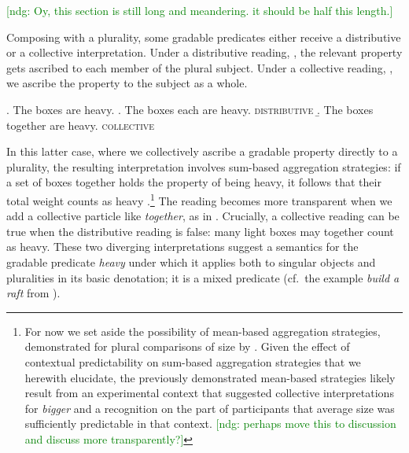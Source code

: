 \documentclass[linguex]{sp}
\newcommand{\ndg}[1]{\textcolor{Green}{[ndg: #1]}}
\begin{document}
%

\ndg{Oy, this section is still long and meandering. it should be half this length.}

Composing with a plurality, some gradable predicates either receive a {distributive} or a {collective} interpretation. Under a distributive reading, \Next[a], the relevant property gets ascribed to each member of the plural subject. Under a collective reading, \Next[b], we ascribe the property to the subject as a whole.

\ex. The boxes are heavy.
\a. The boxes each are heavy. \hfill \textsc{distributive}
\b. The boxes together are heavy. \hfill \textsc{collective}

In this latter case, where we collectively ascribe a gradable property directly to a plurality, the resulting interpretation involves sum-based aggregation strategies: if a set of boxes together holds the property of being heavy, it follows that their total weight counts as heavy \citep{scha1984}.\footnote{For now we set aside the possibility of mean-based aggregation strategies, demonstrated for plural comparisons of size by \cite{scontrasetal2012}. Given the effect of contextual predictability on sum-based aggregation strategies that we herewith elucidate, the previously demonstrated mean-based strategies likely result from an experimental context that suggested collective interpretations for \emph{bigger} and a recognition on the part of participants that average size was sufficiently predictable in that context. \ndg{perhaps move this to discussion and discuss more transparently?}} The reading becomes more transparent when we add a collective particle like \emph{together}, as in \Last[b]. Crucially, a collective reading can be true when the distributive reading is false: many light boxes may together count as heavy. These two diverging interpretations suggest a semantics for the gradable predicate \emph{heavy} under which it applies both to singular objects and pluralities in its basic denotation; it is a mixed predicate (cf.~the example \emph{build a raft} from \citealp{link1983}). 
\end{document}
